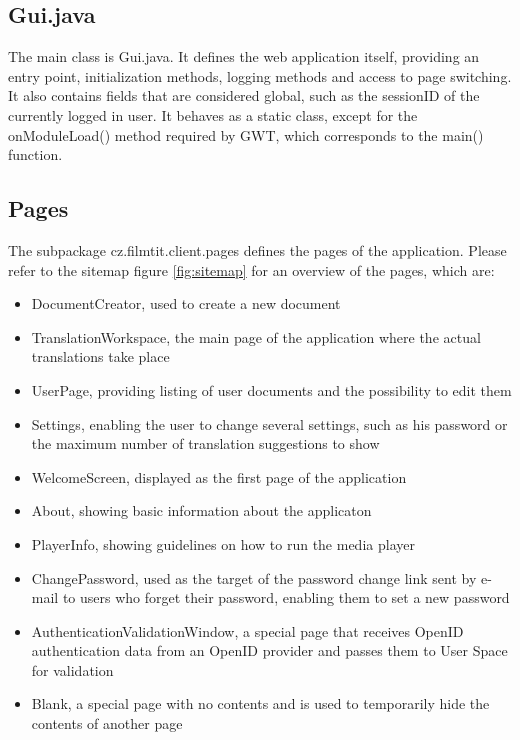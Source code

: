 
\subsection{Gui.java}

The main class is Gui.java. It defines the web application itself, providing an entry point, initialization methods, logging methods and access to page switching. It also contains fields that are considered global, such as the sessionID of the currently logged in user.
It behaves as a static class, except for the onModuleLoad() method required by GWT, which corresponds to the main() function.

\subsection{Pages}

The subpackage cz.filmtit.client.pages defines the pages of the application.
Please refer to the sitemap figure \ref{fig:sitemap} for an overview of the pages, which are:

\begin{itemize}
\item DocumentCreator, used to create a new document
\item TranslationWorkspace, the main page of the application where the actual translations take place
\item UserPage, providing listing of user documents and the possibility to edit them
\item Settings, enabling the user to change several settings, such as his password or the maximum number of translation suggestions to show
\item WelcomeScreen, displayed as the first page of the application
\item About, showing basic information about the applicaton
\item PlayerInfo, showing guidelines on how to run the media player
\item ChangePassword, used as the target of the password change link sent by e-mail to users who forget their password, enabling them to set a new password
\item AuthenticationValidationWindow, a special page that receives OpenID authentication data from an OpenID provider and passes them to User Space for validation
\item Blank, a special page with no contents and is used to temporarily hide the contents of another page
\end{itemize}

